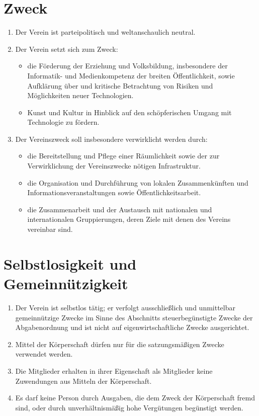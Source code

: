 \documentclass[10pt,conference,a4paper,nofonttune]{IEEEtran}
\begin{document}
\section{Zweck}
\begin{enumerate}
  \item Der Verein ist parteipolitisch und weltanschaulich neutral.

  \item Der Verein setzt sich zum Zweck:
    \begin{itemize}
      \item die Förderung der Erziehung und Volksbildung, insbesondere der
        Informatik- und Medienkompetenz der breiten Öffentlichkeit, sowie
        Aufklärung über und kritische Betrachtung von Risiken und Möglichkeiten
        neuer Technologien.

      \item Kunst und Kultur in Hinblick auf den schöpferischen Umgang mit
        Technologie zu fördern.
    \end{itemize}

  \item Der Vereinszweck soll insbesondere verwirklicht werden durch:
    \begin{itemize}
      \item die Bereitstellung und Pflege einer Räumlichkeit sowie der zur
        Verwirklichung der Vereinszwecke nötigen Infrastruktur.

      \item die Organisation und Durchführung von lokalen Zusammenkünften und
        Informationsveranstaltungen sowie Öffentlichkeitsarbeit.

      \item die Zusammenarbeit und der Austausch mit nationalen und
        internationalen Gruppierungen, deren Ziele mit denen des Vereins
        vereinbar sind.
    \end{itemize}
\end{enumerate}


\section{Selbstlosigkeit und Gemeinnützigkeit}
\begin{enumerate}
  \item Der Verein ist selbstlos tätig; er verfolgt ausschließlich und
    unmittelbar gemeinnützige Zwecke im Sinne des Abschnitts
    \glqq steuerbegünstigte Zwecke \grqq der Abgabenordnung und ist nicht auf
    eigenwirtschaftliche Zwecke ausgerichtet.

  \item Mittel der Körperschaft dürfen nur für die satzungsmäßigen Zwecke
    verwendet werden.

  \item Die Mitglieder erhalten in ihrer Eigenschaft als Mitglieder keine
    Zuwendungen aus Mitteln der Körperschaft.

  \item Es darf keine Person durch Ausgaben, die dem Zweck der Körperschaft
    fremd sind, oder durch unverhältnismäßig hohe Vergütungen begünstigt werden.
\end{enumerate}
\end{document}
